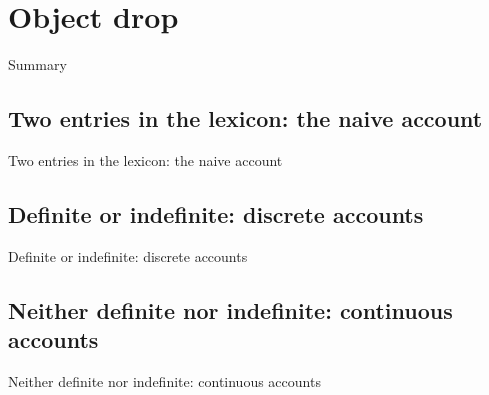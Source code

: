\setchapterpreamble[u]{\margintoc}
\chapter{Object drop}

Summary


\section{Two entries in the lexicon: the naive account} 

Two entries in the lexicon: the naive account


\section{Definite or indefinite: discrete accounts} 

Definite or indefinite: discrete accounts


\section{Neither definite nor indefinite: continuous accounts} 

Neither definite nor indefinite: continuous accounts


